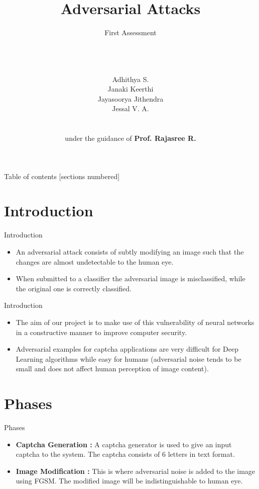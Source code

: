 \documentclass[10pt]{beamer}
\title{\huge{Adversarial Attacks}}
\subtitle{First Assessment}
\date{}
\author{\\\\\\Adhithya S.\\Janaki Keerthi\\Jayasoorya Jithendra\\Jessal V. A.\\\\\\under the guidance of \textbf{Prof. Rajasree R.}}
\begin{document}
\maketitle

\begin{frame}{Table of contents}
  [sections numbered]
  \vspace{0.51in}
  \tableofcontents
\end{frame}

\section{Introduction}

\begin{frame}{Introduction}
\begin{itemize}
\item An adversarial attack consists of subtly modifying an image such that the changes are
almost undetectable to the human eye.
\item When submitted to a
classifier the adversarial image is misclassified, while the original one is correctly
classified.

\end{itemize}
  
\end{frame}


\begin{frame}{Introduction}
\begin{itemize}
    
\item The aim of our project is to make use of this vulnerability of neural networks in a constructive manner  to improve computer security.
\item Adversarial examples for captcha applications are very difficult for Deep Learning algorithms while easy for humans (adversarial noise tends to be small and does not affect human perception of image
content).
\end{itemize}
\end{frame}


\section{Phases}

\begin{frame}{Phases}
\begin{itemize}
    \item \textbf{Captcha Generation :} A captcha generator is used to  give an input captcha to the system. The captcha consists of 6 letters in text format.
    \item \textbf{Image Modification :} This is where adversarial noise is added to the image using FGSM. The modified image will be indistinguishable to human eye.
    
\end{itemize}

\end{frame}
\end{document}
